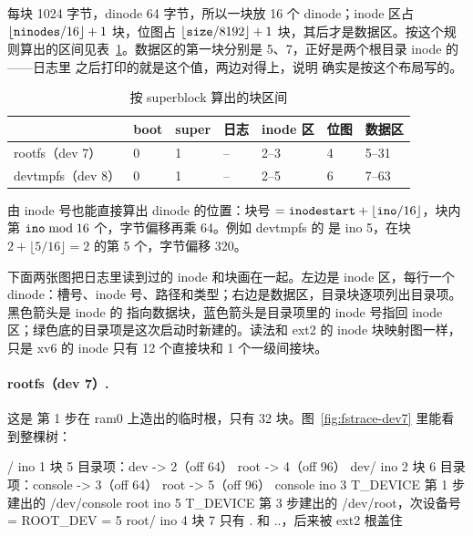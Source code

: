 每块 1024 字节，dinode 64 字节，所以一块放 16 个 dinode；inode 区占 $\lfloor\code{ninodes}/16\rfloor+1$ 块，位图占 $\lfloor\code{size}/8192\rfloor+1$ 块，其后才是数据区。按这个规则算出的区间见表~\ref{tab:fstrace-layout}。数据区的第一块分别是 5、7，正好是两个根目录 inode 的 ——日志里  之后打印的就是这个值，两边对得上，说明  确实是按这个布局写的。

\begin{table}[htbp]
  \centering
  \caption{按 superblock 算出的块区间}
  \label{tab:fstrace-layout}
  \small
  \begin{tabular}{@{}lllllll@{}}
    \toprule
    & boot & super & 日志 & inode 区 & 位图 & 数据区 \\
    \midrule
    rootfs（dev 7）   & 0 & 1 & -- & 2--3 & 4 & 5--31 \\
    devtmpfs（dev 8） & 0 & 1 & -- & 2--5 & 6 & 7--63 \\
    \bottomrule
  \end{tabular}
\end{table}

由 inode 号也能直接算出 dinode 的位置：块号 $=\code{inodestart}+\lfloor\code{ino}/16\rfloor$，块内第 $\code{ino} \bmod 16$ 个，字节偏移再乘 64。例如 devtmpfs 的  是 ino 5，在块 $2+\lfloor 5/16\rfloor=2$ 的第 5 个，字节偏移 320。

下面两张图把日志里读到过的 inode 和块画在一起。左边是 inode 区，每行一个 dinode：槽号、inode 号、路径和类型；右边是数据区，目录块逐项列出目录项。黑色箭头是 inode 的  指向数据块，蓝色箭头是目录项里的 inode 号指回 inode 区；绿色底的目录项是这次启动时新建的。读法和 ext2 的 inode 块映射图一样，只是 xv6 的 inode 只有 12 个直接块和 1 个一级间接块。

\paragraph{rootfs（dev 7）.} 这是  第 1 步在 ram0 上造出的临时根，只有 32 块。图~\ref{fig:fstrace-dev7} 里能看到整棵树：

\begin{txtcode}
/          ino 1   块 5    目录项：dev -> 2（off 64）  root -> 4（off 96）
  dev/     ino 2   块 6    目录项：console -> 3（off 64）  root -> 5（off 96）
    console  ino 3   T_DEVICE   第 1 步建出的 /dev/console
    root     ino 5   T_DEVICE   第 3 步建出的 /dev/root，次设备号 = ROOT_DEV = 5
  root/    ino 4   块 7    只有 . 和 ..，后来被 ext2 根盖住
\end{txtcode}

